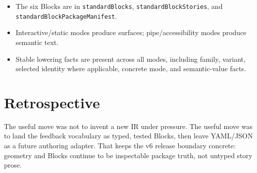 \begin{itemize}
\item
  The six Blocks are in \texttt{s\allowbreak{}t\allowbreak{}a\allowbreak{}n\allowbreak{}d\allowbreak{}a\allowbreak{}r\allowbreak{}d\allowbreak{}B\allowbreak{}l\allowbreak{}o\allowbreak{}c\allowbreak{}k\allowbreak{}s}, \texttt{s\allowbreak{}t\allowbreak{}a\allowbreak{}n\allowbreak{}d\allowbreak{}a\allowbreak{}r\allowbreak{}d\allowbreak{}B\allowbreak{}l\allowbreak{}o\allowbreak{}c\allowbreak{}k\allowbreak{}S\allowbreak{}t\allowbreak{}o\allowbreak{}r\allowbreak{}i\allowbreak{}e\allowbreak{}s}, and \texttt{s\allowbreak{}t\allowbreak{}a\allowbreak{}n\allowbreak{}d\allowbreak{}a\allowbreak{}r\allowbreak{}d\allowbreak{}B\allowbreak{}l\allowbreak{}o\allowbreak{}c\allowbreak{}k\allowbreak{}P\allowbreak{}a\allowbreak{}c\allowbreak{}k\allowbreak{}a\allowbreak{}g\allowbreak{}e\allowbreak{}M\allowbreak{}a\allowbreak{}n\allowbreak{}i\allowbreak{}f\allowbreak{}e\allowbreak{}s\allowbreak{}t}.
\item
  Interactive/static modes produce surfaces; pipe/accessibility modes produce semantic text.
\item
  Stable lowering facts are present across all modes, including family, variant, selected identity where applicable, concrete mode, and semantic-value facts.
\end{itemize}

\section{Retrospective}\label{record-092-retrospective}

The useful move was not to invent a new IR under pressure. The useful move was to land the feedback vocabulary as typed, tested Blocks, then leave YAML/JSON as a future authoring adapter. That keeps the v6 release boundary concrete: geometry and Blocks continue to be inspectable package truth, not untyped story prose.

